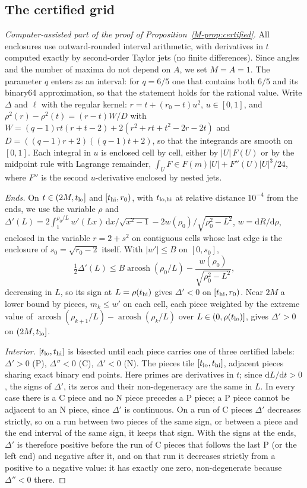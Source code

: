 \documentclass[aip,jmp,amsmath,amssymb,reprint]{revtex4-2}
\newcommand{\dd}{\mathrm{d}}
\theoremstyle{plain}
\theoremstyle{definition}
\begin{document}
\subsection{The certified grid}
\begin{proof}[Computer-assisted part of the proof of Proposition~\ref{M-prop:certified}]
All enclosures use outward-rounded interval arithmetic, with derivatives in $t$ computed
exactly by second-order Taylor jets (no finite differences). Since angles and the number of
maxima do not depend on $A$, we set $M=A=1$. The parameter $q$ enters as an interval: for
$q=6/5$ one that contains both $6/5$ and its binary64 approximation, so that the statement
holds for the rational value. Write $\Delta$ and $\ell$ with
the regular kernel: $r=t+(r_0-t)u^2$, $u\in[0,1]$, and
$\rho^2(r)-\rho^2(t)=(r-t)W/D$ with
$W=(q-1)rt(r+t-2)+2(r^2+rt+t^2-2r-2t)$ and $D=((q-1)r+2)((q-1)t+2)$, so that the
integrands are smooth on $[0,1]$. Each integral in $u$ is enclosed cell by cell, either by
$|U|\,F(U)$ or by the midpoint rule with Lagrange remainder,
$\int_UF\in F(m)|U|+F''(U)|U|^3/24$, where $F''$ is the second $u$-derivative enclosed by
nested jets.

\emph{Ends.} On $t\in(2M,t_{\rm lo}]$ and $[t_{\rm hi},r_0)$, with
$t_{\rm lo,hi}$ at relative distance $10^{-4}$ from the ends, we use the variable
$\rho$ and
$\Delta'(L)=2\int_1^{\rho_0/L}w'(Lx)\,\dd x/\sqrt{x^2-1}-2w(\rho_0)/\sqrt{\rho_0^2-L^2}$,
$w=\dd R/\dd\rho$, enclosed in the variable $r=2+s^2$ on contiguous cells whose last edge is
the enclosure of $s_0=\sqrt{r_0-2}$ itself. With $|w'|\le B$ on $[0,s_0]$,
\[
  \tfrac12\Delta'(L)\le B\operatorname{arcosh}(\rho_0/L)-\frac{w(\rho_0)}{\sqrt{\rho_0^2-L^2}},
\]
decreasing in $L$, so
its sign at $L=\rho(t_{\rm hi})$ gives $\Delta'<0$ on $[t_{\rm hi},r_0)$. Near $2M$ a lower bound
by pieces, $m_k\le w'$ on each cell, each piece weighted by the extreme value of
$\operatorname{arcosh}(\rho_{k+1}/L)-\operatorname{arcosh}(\rho_k/L)$ over $L\in(0,\rho(t_{\rm lo})]$, gives
$\Delta'>0$ on $(2M,t_{\rm lo}]$.

\emph{Interior.} $[t_{\rm lo},t_{\rm hi}]$ is bisected until each piece carries one of
three certified labels: $\Delta'>0$ (P), $\Delta''<0$ (C), $\Delta'<0$ (N). The pieces tile
$[t_{\rm lo},t_{\rm hi}]$, adjacent pieces sharing exact binary end points. Here primes are derivatives in $t$; since $\dd L/\dd t>0$, the signs of $\Delta'$, its zeros and their
non-degeneracy are the same in $L$. In every case there is a C piece and no N piece precedes a P piece; a P piece
cannot be adjacent to an N piece, since $\Delta'$ is continuous. On a run of C pieces $\Delta'$ decreases strictly, so
on a run between two pieces of the same sign, or between a piece and the end interval of the same sign, it keeps that
sign. With the signs at the ends, $\Delta'$ is therefore positive before the run of C pieces that follows the last P
(or the left end) and negative after it, and on that run it decreases strictly from a positive to a negative value:
it has exactly one zero, non-degenerate because $\Delta''<0$ there.


\end{proof}
\end{document}
